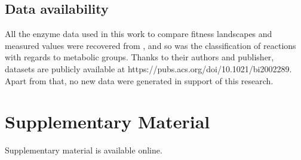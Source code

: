 \documentclass[11pt,onecolumn]{article}
\providecommand{\DIFaddbegin}{} %
\providecommand{\DIFaddend}{} %
\providecommand{\DIFdelbegin}{} %
\providecommand{\DIFdelend}{} %
\begin{document}
\DIFaddend \subsection{Data availability}

All the enzyme data used in this work to compare fitness landscapes and measured values were recovered from \citep{Bar-Even11}, and so was the classification of reactions with regards to metabolic groups. Thanks to their authors and publisher, datasets are publicly available at https://pubs.acs.org/doi/10.1021/bi2002289. Apart from that, no new data were generated in support of this research.

\section{Supplementary Material}

Supplementary material is available online. 

\DIFdelbegin %


\DIFdelend %
\DIFdelbegin %
\DIFdelend \DIFaddbegin \DIFaddend %
\end{document}
